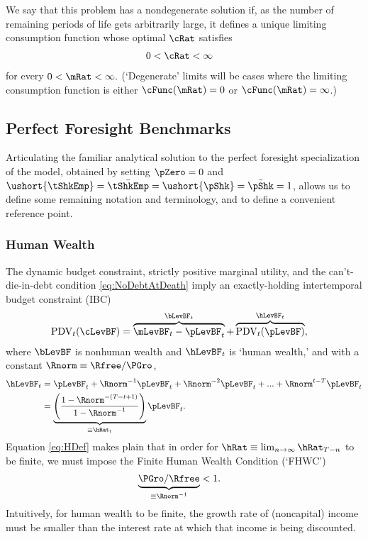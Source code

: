 \documentclass[./BufferStockTheory.tex]{subfiles}
\begin{document}
We say that this problem has a nondegenerate solution if, as the number of remaining periods of life gets arbitrarily large, it
defines a unique limiting consumption function whose optimal
$\cRat$ satisfies
\begin{align}
  0 & < \cRat <  \infty 
\end{align}
for every $0 < \mRat < \infty.$ (`Degenerate' limits will be cases
where the limiting consumption function is either $\cFunc(\mRat)=0$ or $\cFunc(\mRat)=\infty$.)

\hypertarget{Perfect-Foresight-Benchmarks}{}
\subsection{Perfect Foresight Benchmarks}

Articulating the familiar analytical solution to the perfect foresight specialization of the model, obtained by setting $\pZero=0$ and $\ushort{\tShkEmp}=\bar{\tShkEmp}=\ushort{\pShk}=\bar{\pShk}=1$, allows us to define some remaining notation and terminology, and to define a convenient reference point.

\hypertarget{Human-Wealth}{}
\subsubsection{Human Wealth}
The dynamic budget constraint, strictly positive marginal utility, and the can't-die-in-debt condition \eqref{eq:NoDebtAtDeath} imply an exactly-holding intertemporal budget constraint (IBC)
\begin{align}
  \text{PDV}_{t}(\cLevBF)  & = \overbrace{\mLevBF_{t}-\pLevBF_{t}}^{\bLevBF_{t}}+\overbrace{\text{PDV}_{t}(\pLevBF)}^{\hLevBF_{t}}, \label{eq:IBCFinite}
\end{align}
where $\bLevBF$ is nonhuman wealth and $\hLevBF_{t}$ is `human wealth,' and with a constant $\Rnorm \equiv \Rfree/\PGro$,
\begin{align}
  \hLevBF_{t}  & = \pLevBF_{t}+\Rnorm^{-1} \pLevBF_{t} + \Rnorm^{-2} \pLevBF_{t} + ... + \Rnorm^{t-T} \pLevBF_{t} \notag
\\  & = \underbrace{\left(\frac{1-\Rnorm^{-(T-t+1)}}{1-\Rnorm^{-1}}\right)}_{\equiv \hRat_{t}}\pLevBF_{t} \label{eq:HDef}.
\end{align}
Equation \eqref{eq:HDef} makes plain that in order for $\hRat \equiv \lim_{n \rightarrow
  \infty} \hRat_{T-n}$ to be finite, we must
impose the Finite Human Wealth Condition (`FHWC') \hypertarget{FHWC}{}
\begin{align}
  \underbrace{\PGro/\Rfree}_{\equiv \Rnorm^{-1}}  & < 1 \label{eq:FHWC}.
\end{align}
Intuitively, for human wealth to be finite, the growth rate of (noncapital) income must be smaller than
the interest rate at which that income is being discounted.
\end{document}
